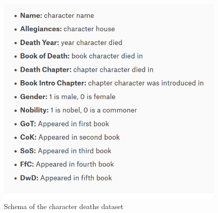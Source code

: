 \documentclass[]{article}
\begin{document}
\begin{itemize}
\begin{figure}
\centering
        \includegraphics[totalheight=10cm]{deaths.png}
        \caption{Schema of the character deaths dataset}
\end{figure}



\end{itemize}
\end{document}
